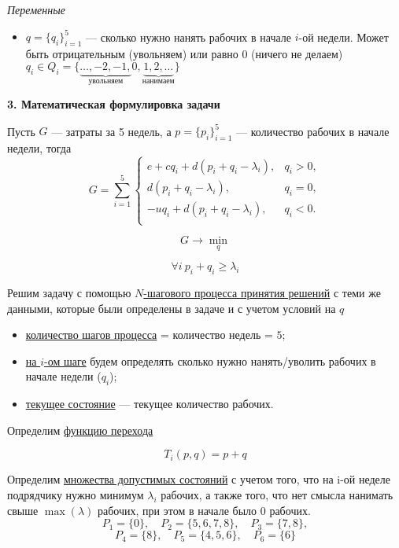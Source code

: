 \bigskip

\textit{Переменные}

\begin{itemize}[nosep]	
	\item $q = \{q_i\}_{i=1}^5$ --- сколько нужно нанять рабочих в начале $i$-ой недели. Может быть отрицательным (увольняем) или равно 0 (ничего не делаем) $q_i \in Q_i = \{\underbrace{\dots, -2, -1,}_{\text{увольняем}} 0, \underbrace{1, 2, \dots}_{\text{нанимаем}}\}$
\end{itemize}

\bigskip

\textbf{3. Математическая формулировка задачи}

Пусть $G$ --- затраты за 5 недель, а $p = \{p_i\}_{i=1}^5$ --- количество рабочих в начале недели, тогда
\[G = \sum_{i=1}^{5}  \begin{cases}
	e + cq_i + d(p_i + q_i - \lambda_i),& q_i > 0, \\
	d(p_i + q_i - \lambda_i),& q_i = 0, \\
	-uq_i + d(p_i + q_i - \lambda_i),& q_i < 0. \\
\end{cases}\]

\[G \to \min_{q}\]

\[\forall  i \ p_i + q_i \ge \lambda_i \tag{*}\]

\solution
Решим задачу с помощью \hyperref[n_step_process]{$N$-шагового процесса принятия решений} с теми же данными, которые были определены в задаче и с учетом условий на $q$

\begin{itemize}[nosep]
	\item \underline{количество шагов процесса} = количество недель = $5$;
	
	\item \underline{на $i$-ом шаге} будем определять сколько нужно нанять/уволить рабочих в начале недели ($q_i$);
	
	\item \underline{текущее состояние} --- текущее количество рабочих.
\end{itemize}

\bigskip

Определим \underline{функцию перехода}

\[T_i(p, q) = p + q\]

\bigskip

Определим \underline{множества допустимых состояний} с учетом того, что на i-ой неделе подрядчику нужно минимум $\lambda_i$ рабочих, а также того, что нет смысла нанимать свыше $\max (\lambda)$ рабочих, при этом в начале было 0 рабочих.
\[
P_1 = \{0\}, \quad P_2 = \{5, 6, 7, 8\}, \quad P_3 = \{7, 8\},
\]
\[
P_4 = \{8\}, \quad P_5 = \{4, 5, 6\}, \quad P_6 = \{6\}
\]

